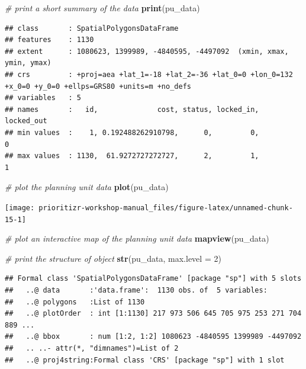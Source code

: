 \documentclass[12pt,]{book}
\newenvironment{Shaded}{\begin{snugshade}}{\end{snugshade}}
\newcommand{\KeywordTok}[1]{\textcolor[rgb]{0.13,0.29,0.53}{\textbf{#1}}}
\newcommand{\DataTypeTok}[1]{\textcolor[rgb]{0.13,0.29,0.53}{#1}}
\newcommand{\DecValTok}[1]{\textcolor[rgb]{0.00,0.00,0.81}{#1}}
\newcommand{\CommentTok}[1]{\textcolor[rgb]{0.56,0.35,0.01}{\textit{#1}}}
\newcommand{\NormalTok}[1]{#1}
\begin{document}
\begin{Shaded}
\begin{Highlighting}[]
\CommentTok{# print a short summary of the data}
\KeywordTok{print}\NormalTok{(pu_data)}
\end{Highlighting}
\end{Shaded}

\begin{verbatim}
## class       : SpatialPolygonsDataFrame 
## features    : 1130 
## extent      : 1080623, 1399989, -4840595, -4497092  (xmin, xmax, ymin, ymax)
## crs         : +proj=aea +lat_1=-18 +lat_2=-36 +lat_0=0 +lon_0=132 +x_0=0 +y_0=0 +ellps=GRS80 +units=m +no_defs 
## variables   : 5
## names       :   id,              cost, status, locked_in, locked_out 
## min values  :    1, 0.192488262910798,      0,         0,          0 
## max values  : 1130,  61.9272727272727,      2,         1,          1
\end{verbatim}

\begin{Shaded}
\begin{Highlighting}[]
\CommentTok{# plot the planning unit data}
\KeywordTok{plot}\NormalTok{(pu_data)}
\end{Highlighting}
\end{Shaded}

\begin{center}\texttt{[image: prioritizr-workshop-manual\_files/figure-latex/unnamed-chunk-15-1]} \end{center}

\begin{Shaded}
\begin{Highlighting}[]
\CommentTok{# plot an interactive map of the planning unit data}
\KeywordTok{mapview}\NormalTok{(pu_data)}
\end{Highlighting}
\end{Shaded}

\begin{Shaded}
\begin{Highlighting}[]
\CommentTok{# print the structure of object}
\KeywordTok{str}\NormalTok{(pu_data, }\DataTypeTok{max.level =} \DecValTok{2}\NormalTok{)}
\end{Highlighting}
\end{Shaded}

\begin{verbatim}
## Formal class 'SpatialPolygonsDataFrame' [package "sp"] with 5 slots
##   ..@ data       :'data.frame':  1130 obs. of  5 variables:
##   ..@ polygons   :List of 1130
##   ..@ plotOrder  : int [1:1130] 217 973 506 645 705 975 253 271 704 889 ...
##   ..@ bbox       : num [1:2, 1:2] 1080623 -4840595 1399989 -4497092
##   .. ..- attr(*, "dimnames")=List of 2
##   ..@ proj4string:Formal class 'CRS' [package "sp"] with 1 slot
\end{verbatim}
\end{document}
